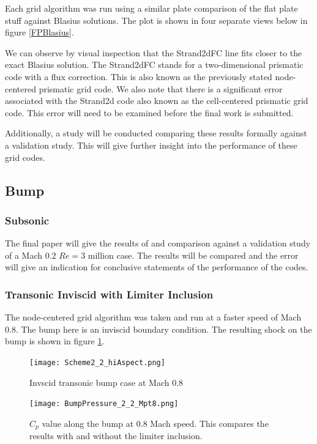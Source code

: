 \documentclass[final]{aiaa-pretty}
\begin{document}
Each grid algorithm was run using a similar plate comparison of the flat plate stuff against Blasius solutions.  The plot is shown in four separate views below in figure \ref{FPBlasius}.


We can observe by visual inspection that the Strand2dFC line fits closer to the exact Blasius solution.  The Strand2dFC stands for a two-dimensional prismatic code with a flux correction.  This is also known as the previously stated node-centered prismatic grid code.  We also note that there is a significant error associated with the Strand2d code also known as the cell-centered prismatic grid code.  This error will need to be examined before the final work is submitted. 

Additionally, a study will be conducted comparing these results formally against a validation study. This will give further insight into the performance of these grid codes.

\subsection{Bump}

\subsubsection{Subsonic}
The final paper will give the results of and comparison against a validation study of a Mach $0.2$ $Re = 3$ million case.  The results will be compared and the error will give an indication for conclusive statements of the performance of the codes.
\subsubsection{Transonic Inviscid with Limiter Inclusion}
The node-centered grid algorithm was taken and run at a faster speed of Mach $0.8$.  The bump here is an inviscid boundary condition.  The resulting shock on the bump is shown in figure \ref{ITB}.

\begin{figure}[h!]
\centering
\texttt{[image: Scheme2\_2\_hiAspect.png]}
\caption{Invscid transonic bump case at Mach 0.8}
\label{ITB}
\end{figure}

\begin{figure}[h!]
\centering
\texttt{[image: BumpPressure\_2\_2\_Mpt8.png]}
\caption{$C_p$ value along the bump at 0.8 Mach speed.  This compares the results with and without the limiter inclusion.}
\label{CP}
\end{figure}
\end{document}
